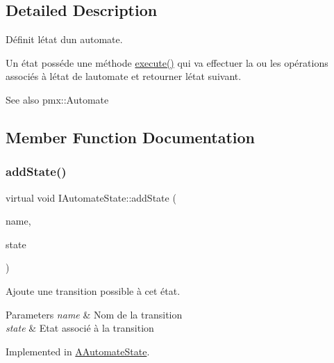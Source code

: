 \subsection{Detailed Description}
Définit l\textquotesingle{}état d\textquotesingle{}un automate. 

Un état posséde une méthode \hyperlink{classIAutomateState_a58bf3c2c5b55f7ba3fc1783fc36e102b}{execute()} qui va effectuer la ou les opérations associés à l\textquotesingle{}état de l\textquotesingle{}automate et retourner l\textquotesingle{}état suivant.

\begin{DoxySeeAlso}{See also}
pmx\+::\+Automate 
\end{DoxySeeAlso}


\subsection{Member Function Documentation}
\mbox{\label{classIAutomateState_a2d088c807e6d7b30b93511096a34af2a}} 
\subsubsection{\texorpdfstring{add\+State()}{addState()}}
{\footnotesize\ttfamily virtual void I\+Automate\+State\+::add\+State (\begin{DoxyParamCaption}\item[{const std\+::string \&}]{name,  }\item[{\hyperlink{classIAutomateState}{I\+Automate\+State} $\ast$}]{state }\end{DoxyParamCaption})\hspace{0.3cm}{\ttfamily [pure virtual]}}



Ajoute une transition possible à cet état. 


\begin{DoxyParams}{Parameters}
{\em name} & Nom de la transition \\
\hline
{\em state} & Etat associé à la transition \\
\hline
\end{DoxyParams}


Implemented in \hyperlink{classAAutomateState_a2f141db7bda71b605195c3516b0dac51}{A\+Automate\+State}.

